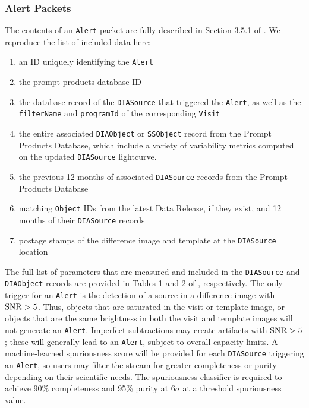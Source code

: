 \subsubsection{Alert Packets}\label{sec:packets}

The contents of an {\tt Alert} packet are fully described in Section 3.5.1 of . We reproduce the list of included data here:
\renewcommand{\labelenumi}{\Roman{enumi}.}
\begin{enumerate}
\item an ID uniquely identifying the {\tt Alert}
\item the prompt products database ID
\item the database record of the {\tt DIASource} that triggered the {\tt Alert}, as well as the \texttt{filterName} and \texttt{programId} of the corresponding \texttt{Visit}
\item the entire associated {\tt DIAObject} or {\tt SSObject} record from the Prompt Products Database, which include a variety of variability metrics computed on the
updated \texttt{DIASource} lightcurve.
\item the previous 12 months of associated {\tt DIASource} records from the Prompt Products Database
\item matching {\tt Object} IDs from the latest Data Release, if they exist, and 12 months of their {\tt DIASource} records
\item postage stamps of the difference image and template at the {\tt DIASource} location
\end{enumerate}

The full list of parameters that are measured and included in the {\tt DIASource} and {\tt DIAObject} records are provided in Tables 1 and 2 of , respectively.
The only trigger for an {\tt Alert} is the detection of a source in a difference image with ${\rm SNR} > 5$.
Thus, objects that are saturated in the visit or template image, or objects that are the same brightness in both the visit and template images will not generate an {\tt Alert}.
Imperfect subtractions may create artifacts with ${\rm SNR} > 5$;
these will generally lead to an \texttt{Alert}, subject to overall capacity limits.
A machine-learned spuriousness score will be provided for each \texttt{DIASource} triggering an \texttt{Alert}, so users may filter the stream for greater completeness or purity depending on their scientific needs.
The spuriousness classifier is required to achieve
90\% completeness and 95\% purity at 6$\sigma$  at a threshold spuriousness value.



